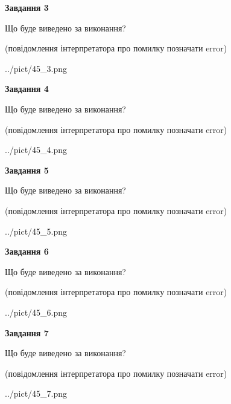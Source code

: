 \documentclass[12pt, ukrainian]{article}
\begin{document}
{\begin {large}
{\begin {center}\textbf{Завдання 3}\end {center}}\par
Що буде виведено за виконання?\par
 (повідомлення інтерпретатора про помилку позначати error)\par
\begin{center}
	{../pict/45_3.png}
\end{center}
\newpage

{\begin {center}\textbf{Завдання 4}\end {center}}\par
Що буде виведено за виконання?\par
 (повідомлення інтерпретатора про помилку позначати error)\par
\begin{center}
	{../pict/45_4.png}
\end{center}
\newpage

{\begin {center}\textbf{Завдання 5}\end {center}}\par
Що буде виведено за виконання?\par
 (повідомлення інтерпретатора про помилку позначати error)\par
\begin{center}
	{../pict/45_5.png}
\end{center}
\newpage

{\begin {center}\textbf{Завдання 6}\end {center}}\par
Що буде виведено за виконання?\par
 (повідомлення інтерпретатора про помилку позначати error)\par
\begin{center}
	{../pict/45_6.png}
\end{center}
\newpage

{\begin {center}\textbf{Завдання 7}\end {center}}\par
Що буде виведено за виконання?\par
 (повідомлення інтерпретатора про помилку позначати error)\par
\begin{center}
	{../pict/45_7.png}
\end{center}
\newpage


\end{large}}
\end{document}
